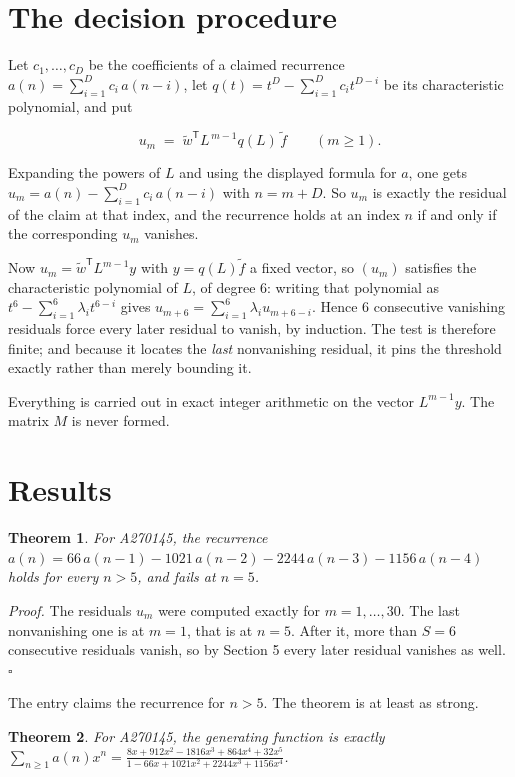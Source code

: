 \documentclass[11pt]{article}
\newtheorem{theorem}{Theorem}
\theoremstyle{definition}
\begin{document}
\section{The decision procedure}

Let $c_1,\dots,c_D$ be the coefficients of a claimed recurrence $a(n) = \sum_{i=1}^{D} c_i\,a(n-i)$, let $q(t) = t^{D} - \sum_{i=1}^{D} c_i t^{D-i}$ be its characteristic polynomial, and put

\[u_m \;=\; \tilde w^{\mathsf T} L^{\,m-1} q(L)\,\tilde f \qquad (m \ge 1).\]

Expanding the powers of $L$ and using the displayed formula for $a$, one gets $u_m = a(n) - \sum_{i=1}^{D} c_i\,a(n-i)$ with $n = m + D$. So $u_m$ is exactly the residual of the claim at that index, and the recurrence holds at an index $n$ if and only if the corresponding $u_m$ vanishes.

Now $u_m = \tilde w^{\mathsf T} L^{m-1} y$ with $y = q(L)\tilde f$ a fixed vector, so $(u_m)$ satisfies the characteristic polynomial of $L$, of degree $6$: writing that polynomial as $t^{6} - \sum_{i=1}^{6} \lambda_i t^{6-i}$ gives $u_{m+6} = \sum_{i=1}^{6} \lambda_i u_{m+6-i}$. Hence $6$ consecutive vanishing residuals force every later residual to vanish, by induction. The test is therefore finite; and because it locates the {\itshape last} nonvanishing residual, it pins the threshold exactly rather than merely bounding it.

Everything is carried out in exact integer arithmetic on the vector $L^{m-1}y$. The matrix $M$ is never formed.

\section{Results}

\begin{theorem} For A270145, the recurrence $a(n) = 66\,a(n-1) - 1021\,a(n-2) - 2244\,a(n-3) - 1156\,a(n-4)$ holds for every $n > 5$, and fails at $n = 5$.\end{theorem}

{\itshape Proof.} The residuals $u_m$ were computed exactly for $m = 1,\dots,30$. The last nonvanishing one is at $m = 1$, that is at $n = 5$. After it, more than $S = 6$ consecutive residuals vanish, so by Section 5 every later residual vanishes as well. $\square$

The entry claims the recurrence for $n > 5$. The theorem is at least as strong.

\begin{theorem} For A270145, the generating function is exactly $\sum_{n\ge 1} a(n)x^n = \frac{8x + 912x^{2} - 1816x^{3} + 864x^{4} + 32x^{5}}{1 - 66x + 1021x^{2} + 2244x^{3} + 1156x^{4}}$.\end{theorem}
\end{document}
